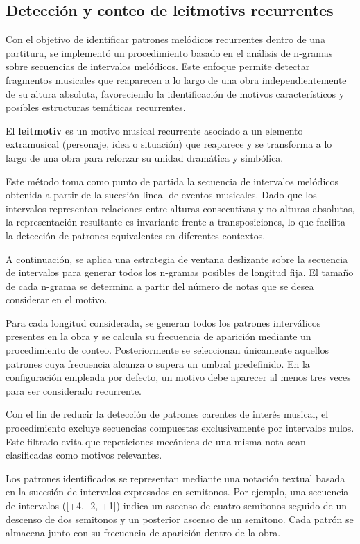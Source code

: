 \subsection{Detección y conteo de leitmotivs recurrentes}
Con el objetivo de identificar patrones melódicos recurrentes dentro de una partitura, se implementó un procedimiento basado en el análisis de n-gramas sobre secuencias de intervalos melódicos. Este enfoque permite detectar fragmentos musicales que reaparecen a lo largo de una obra independientemente de su altura absoluta, favoreciendo la identificación de motivos característicos y posibles estructuras temáticas recurrentes.

El \textbf{leitmotiv} \citep{grove1900dictionary} es un motivo musical recurrente asociado a un elemento extramusical (personaje, idea o situación) que reaparece y se transforma a lo largo de una obra para reforzar su unidad dramática y simbólica.

Este método toma como punto de partida la secuencia de intervalos melódicos obtenida a partir de la sucesión lineal de eventos musicales. Dado que los intervalos representan relaciones entre alturas consecutivas y no alturas absolutas, la representación resultante es invariante frente a transposiciones, lo que facilita la detección de patrones equivalentes en diferentes contextos.

A continuación, se aplica una estrategia de ventana deslizante sobre la secuencia de intervalos para generar todos los n-gramas posibles de longitud fija. El tamaño de cada n-grama se determina a partir del número de notas que se desea considerar en el motivo.

Para cada longitud considerada, se generan todos los patrones interválicos presentes en la obra y se calcula su frecuencia de aparición mediante un procedimiento de conteo. Posteriormente se seleccionan únicamente aquellos patrones cuya frecuencia alcanza o supera un umbral predefinido. En la configuración empleada por defecto, un motivo debe aparecer al menos tres veces para ser considerado recurrente.

Con el fin de reducir la detección de patrones carentes de interés musical, el procedimiento excluye secuencias compuestas exclusivamente por intervalos nulos. Este filtrado evita que repeticiones mecánicas de una misma nota sean clasificadas como motivos relevantes.

Los patrones identificados se representan mediante una notación textual basada en la sucesión de intervalos expresados en semitonos. Por ejemplo, una secuencia de intervalos ([+4, -2, +1]) indica un ascenso de cuatro semitonos seguido de un descenso de dos semitonos y un posterior ascenso de un semitono. Cada patrón se almacena junto con su frecuencia de aparición dentro de la obra.

